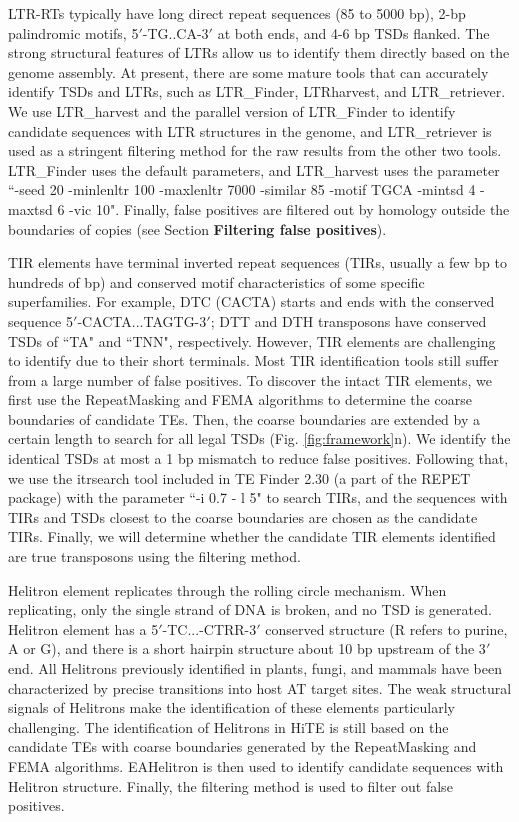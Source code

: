\documentclass{bmcart}
\begin{document}
LTR-RTs typically have long direct repeat sequences (85 to 5000 bp), 2-bp palindromic motifs, 5$'$-TG..CA-3$'$ at both ends, and 4-6 bp TSDs flanked. The strong structural features of LTRs allow us to identify them directly based on the genome assembly. At present, there are some mature tools that can accurately identify TSDs and LTRs, such as LTR\_Finder, LTRharvest, and LTR\_retriever. We use LTR\_harvest and the parallel version of LTR\_Finder\cite{ou2019ltr_finder_parallel, xu2007ltr_finder} to identify candidate sequences with LTR structures in the genome, and LTR\_retriever is used as a stringent filtering method for the raw results from the other two tools. LTR\_Finder uses the default parameters, and LTR\_harvest uses the parameter ``-seed 20 -minlenltr 100 -maxlenltr 7000 -similar 85 -motif TGCA -mintsd 4 -maxtsd 6 -vic 10".  Finally, false positives are filtered out by homology outside the boundaries of copies (see Section \textbf{Filtering false positives}).

TIR elements have terminal inverted repeat sequences (TIRs, usually a few bp to hundreds of bp) and conserved motif characteristics of some specific superfamilies. For example, DTC (CACTA) starts and ends with the conserved sequence 5$'$-CACTA...TAGTG-3$'$; DTT and DTH transposons have conserved TSDs of ``TA" and ``TNN", respectively. However, TIR elements are challenging to identify due to their short terminals. Most TIR identification tools still suffer from a large number of false positives. To discover the intact TIR elements, we first use the RepeatMasking and FEMA algorithms to determine the coarse boundaries of candidate TEs. Then, the coarse boundaries are extended by a certain length to search for all legal TSDs (Fig. \ref{fig:framework}n). We identify the identical TSDs at most a 1 bp mismatch to reduce false positives. Following that, we use the itrsearch tool included in TE Finder 2.30 (a part of the REPET\cite{quesneville2010repet} package) with the parameter ``-i 0.7 - l 5" to search TIRs, and the sequences with TIRs and TSDs closest to the coarse boundaries are chosen as the candidate TIRs. Finally, we will determine whether the candidate TIR elements identified are true transposons using the filtering method. 

Helitron element replicates through the rolling circle mechanism. When replicating, only the single strand of DNA is broken, and no TSD is generated. Helitron element has a 5$'$-TC...-CTRR-3$'$ conserved structure (R refers to purine, A or G), and there is a short hairpin structure about 10 bp upstream of the 3$'$ end. All Helitrons previously identified in plants, fungi, and mammals have been characterized by precise transitions into host AT target sites\cite{kapitonov2007helitrons}. The weak structural signals of Helitrons make the identification of these elements particularly challenging. The identification of Helitrons in HiTE is still based on the candidate TEs with coarse boundaries generated by the RepeatMasking and FEMA algorithms. EAHelitron\cite{hu2019helitron} is then used to identify candidate sequences with Helitron structure. Finally, the filtering method is used to filter out false positives.
\end{document}
